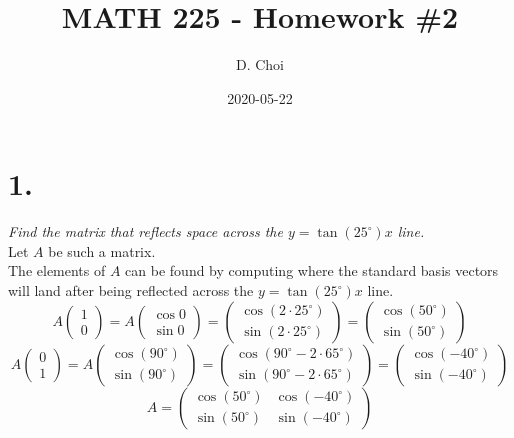 \documentclass[12pt]{article}
\title{\vspace{-4\baselineskip}MATH 225 - Homework \#2}
\author{D. Choi}
\date{2020-05-22}
\begin{document}
\maketitle

\section*{1.}
\textit{Find the matrix that reflects space across the
$y = \tan(25^\circ)x$
line.
} \\[\baselineskip]
Let $A$ be such a matrix. \\
The elements of $A$ can be found by computing where the standard basis vectors
will land after being reflected across the
$y = \tan(25^\circ)x$
line.
\begin{equation*}
	A
	\begin{pmatrix}
		1 \\
		0
	\end{pmatrix}
	=
	A
	\begin{pmatrix}
		\cos0 \\
		\sin0
	\end{pmatrix}
	=
	\begin{pmatrix}
		\cos(2 \cdot 25^\circ) \\
		\sin(2 \cdot 25^\circ)
	\end{pmatrix}
	=
	\begin{pmatrix}
		\cos(50^\circ) \\
		\sin(50^\circ)
	\end{pmatrix}
\end{equation*}
\begin{equation*}
	A
	\begin{pmatrix}
		0 \\
		1
	\end{pmatrix}
	=
	A
	\begin{pmatrix}
		\cos(90^\circ) \\
		\sin(90^\circ)
	\end{pmatrix}
	=
	\begin{pmatrix}
		\cos(90^\circ - 2 \cdot 65^\circ) \\
		\sin(90^\circ - 2 \cdot 65^\circ)
	\end{pmatrix}
	=
	\begin{pmatrix}
		\cos(-40^\circ) \\
		\sin(-40^\circ)
	\end{pmatrix}
\end{equation*}
\begin{equation*}
	A =
	\boxed{
		\begin{pmatrix}
			\cos(50^\circ) & \cos(-40^\circ) \\
			\sin(50^\circ) & \sin(-40^\circ)
		\end{pmatrix}
	}
\end{equation*}
\end{document}
